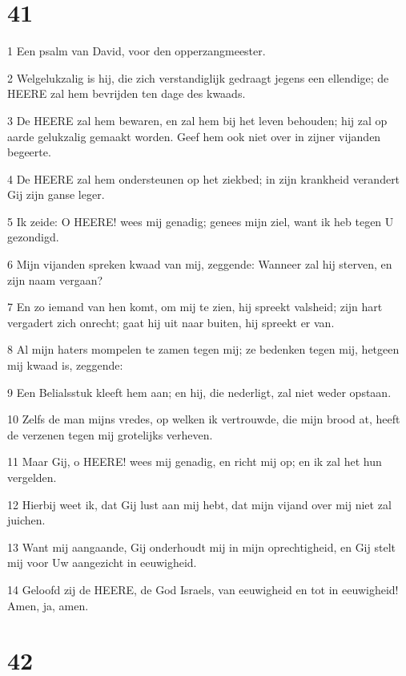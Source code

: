\chapter{41}

\par 1 Een psalm van David, voor den opperzangmeester.
\par 2 Welgelukzalig is hij, die zich verstandiglijk gedraagt jegens een ellendige; de HEERE zal hem bevrijden ten dage des kwaads.
\par 3 De HEERE zal hem bewaren, en zal hem bij het leven behouden; hij zal op aarde gelukzalig gemaakt worden. Geef hem ook niet over in zijner vijanden begeerte.
\par 4 De HEERE zal hem ondersteunen op het ziekbed; in zijn krankheid verandert Gij zijn ganse leger.
\par 5 Ik zeide: O HEERE! wees mij genadig; genees mijn ziel, want ik heb tegen U gezondigd.
\par 6 Mijn vijanden spreken kwaad van mij, zeggende: Wanneer zal hij sterven, en zijn naam vergaan?
\par 7 En zo iemand van hen komt, om mij te zien, hij spreekt valsheid; zijn hart vergadert zich onrecht; gaat hij uit naar buiten, hij spreekt er van.
\par 8 Al mijn haters mompelen te zamen tegen mij; ze bedenken tegen mij, hetgeen mij kwaad is, zeggende:
\par 9 Een Belialsstuk kleeft hem aan; en hij, die nederligt, zal niet weder opstaan.
\par 10 Zelfs de man mijns vredes, op welken ik vertrouwde, die mijn brood at, heeft de verzenen tegen mij grotelijks verheven.
\par 11 Maar Gij, o HEERE! wees mij genadig, en richt mij op; en ik zal het hun vergelden.
\par 12 Hierbij weet ik, dat Gij lust aan mij hebt, dat mijn vijand over mij niet zal juichen.
\par 13 Want mij aangaande, Gij onderhoudt mij in mijn oprechtigheid, en Gij stelt mij voor Uw aangezicht in eeuwigheid.
\par 14 Geloofd zij de HEERE, de God Israels, van eeuwigheid en tot in eeuwigheid! Amen, ja, amen.

\chapter{42}


